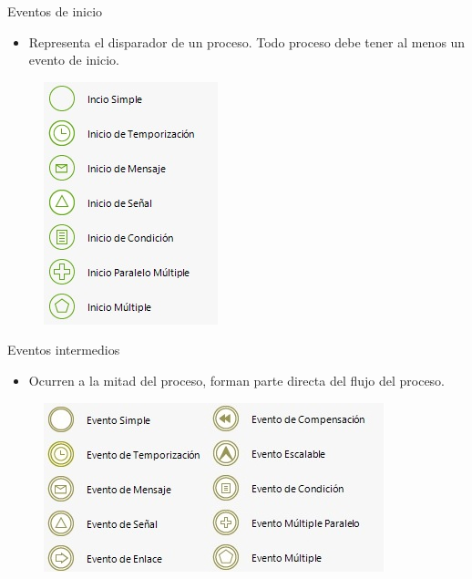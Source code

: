\begin{frame}{Eventos de inicio}
    \begin{itemize}
        \item Representa el disparador de un proceso. Todo proceso debe tener al menos un evento de inicio.
    \end{itemize}
    \begin{figure}
        \centering
        \includegraphics[scale=0.8]{images/event_start.jpg}
    \end{figure}
\end{frame}

\begin{frame}{Eventos intermedios}
    \begin{itemize}
        \item Ocurren a la mitad del proceso, forman parte directa del flujo del proceso.
    \end{itemize}
    \begin{figure}
        \centering
        \includegraphics[scale=0.8]{images/event_intermediate.jpg}
    \end{figure}    
\end{frame}


